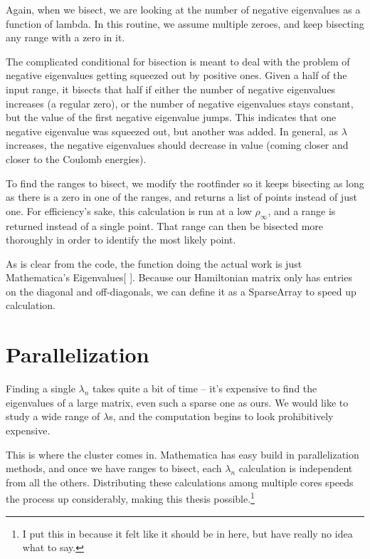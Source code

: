 \documentclass[12pt,twoside]{reedthesis}
\begin{document}
Again, when we bisect, we are looking at the number of negative eigenvalues as a function of lambda. In this routine, we assume multiple zeroes, and keep bisecting any range with a zero in it.

The complicated conditional for bisection is meant to deal with the problem of negative eigenvalues getting squeezed out by positive ones. Given a half of the input range, it bisects that half if either the number of negative eigenvalues increases (a regular zero), or the number of negative eigenvalues stays constant, but the value of the first negative eigenvalue jumps. This indicates that one negative eigenvalue was squeezed out, but another was added. In general, as $\lambda$ increases, the negative eigenvalues should decrease in value (coming closer and closer to the Coulomb energies). 

To find the ranges to bisect, we modify the rootfinder so it keeps bisecting as long as there is a zero in one of the ranges, and returns a list of points instead of just one. For efficiency's sake, this calculation is run at a low $\rho_{\infty}$, and a range is returned instead of a single point. That range can then be bisected more thoroughly in order to identify the most likely point. 

As is clear from the code, the function doing the actual work is just Mathematica's Eigenvalues[ ]. Because our Hamiltonian matrix only has entries on the diagonal and off-diagonals, we can define it as a SparseArray to speed up calculation. 

\section{Parallelization}

Finding a single $\lambda_{n}$ takes quite a bit of time -- it's expensive to find the eigenvalues of a large matrix, even such a sparse one as ours. We would like to study a wide range of $\lambda$s, and the computation begins to look prohibitively expensive.

This is where the cluster comes in. Mathematica has easy build in parallelization methods, and once we have ranges to bisect, each $\lambda_{n}$ calculation is independent from all the others. Distributing these calculations among multiple cores speeds the process up considerably, making this thesis possible.\footnote{I put this in because it felt like it should be in here, but have really no idea what to say.}

%
%
%
\backmatter %
%
\end{document}
